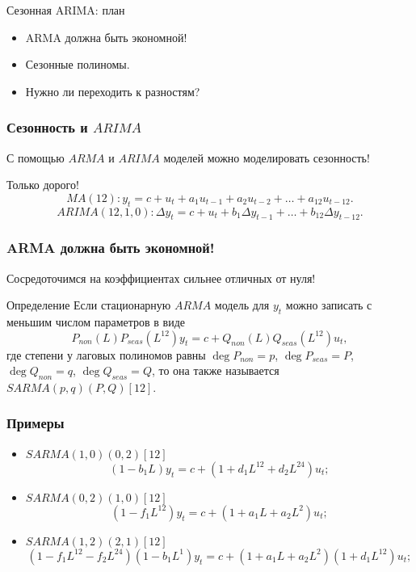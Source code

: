 
\begin{frame} %


\end{frame}



\begin{frame}{Сезонная ARIMA: план}
  \begin{itemize}[<+->]
    \item ARMA должна быть экономной! 
    \item Сезонные полиномы.
    \item Нужно ли переходить к разностям?
  \end{itemize}

\end{frame}


\begin{frame}
  \frametitle{Сезонность и $ARIMA$}

  С помощью $ARMA$ и $ARIMA$ моделей можно моделировать сезонность!

  \pause
  Только \alert{дорого}!\pause
  \[
   MA(12):     y_t = c + u_t + a_1 u_{t-1} + a_2 u_{t-2} + \ldots + a_{12} u_{t-12}.
  \]
  \[
   ARIMA(12, 1, 0):     \Delta y_t = c + u_t  + b_1 \Delta y_{t-1} + \ldots + b_{12} \Delta y_{t-12}.
  \]

\end{frame}



\begin{frame}
  \frametitle{ARMA должна быть экономной!}

  Сосредоточимся на коэффициентах \alert{сильнее отличных} от нуля!
  \pause
\begin{block}{Определение}
Если стационарную $ARMA$ модель для $y_t$ можно записать с меньшим числом параметров в виде
\[
P_{non}(L)P_{seas}(L^{12}) y_t = c + Q_{non}(L) Q_{seas}(L^{12}) u_t,
\]
где степени у лаговых полиномов равны $\deg P_{non} =p$, $\deg P_{seas} =P$, $\deg Q_{non} =q$, $\deg Q_{seas} =Q$, 
то она также называется $SARMA(p, q)(P, Q)[12]$.
\end{block}
\end{frame}


\begin{frame}
  \frametitle{Примеры}

  \begin{itemize}[<+->]
    \item $SARMA(1,0)(0,2)[12]$
    \[
    (1 - b_1 L) y_t = c + (1 + d_1 L^{12} + d_2 L^{24}) u_t;  
    \]
    \item $SARMA(0,2)(1,0)[12]$
    \[
    (1 - f_1 L^{12}) y_t = c + (1 + a_1 L + a_2 L^2) u_t;  
    \]
    \item $SARMA(1,2)(2,1)[12]$
    \[
    (1 - f_1 L^{12} - f_2 L^{24}) (1 - b_1 L^1) y_t = c + (1 + a_1 L + a_2 L^2) (1 + d_1 L^{12}) u_t;  
    \]
  \end{itemize}

  

\end{frame}





